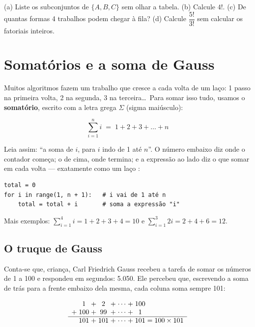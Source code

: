 \begin{exrapido}
(a) Liste os subconjuntos de $\{A, B, C\}$ sem olhar a tabela. (b) Calcule $4!$. (c) De quantas
formas 4 trabalhos podem chegar à fila? (d) Calcule $\dfrac{5!}{3!}$ sem calcular os fatoriais
inteiros.
\end{exrapido}

\section{Somatórios e a soma de Gauss}

Muitos algoritmos fazem um trabalho que cresce a cada volta de um laço: 1 passo na primeira volta,
2 na segunda, 3 na terceira\dots\ Para somar isso tudo, usamos o \textbf{somatório}, escrito com a
letra grega $\Sigma$ (sigma maiúsculo):

\[
\sum_{i=1}^{n} i \;=\; 1 + 2 + 3 + \dots + n
\]

Leia assim: \enquote{a soma de $i$, para $i$ indo de 1 até $n$}. O número embaixo diz onde o
contador começa; o de cima, onde termina; e a expressão ao lado diz o que somar em cada volta —
exatamente como um laço :

\begin{lstlisting}
total = 0
for i in range(1, n + 1):   # i vai de 1 até n
    total = total + i       # soma a expressão "i"
\end{lstlisting}

Mais exemplos: $\sum_{i=1}^{4} i = 1 + 2 + 3 + 4 = 10$ \quad e \quad
$\sum_{i=1}^{3} 2i = 2 + 4 + 6 = 12$.

\subsection{O truque de Gauss}

Conta-se que, criança, Carl Friedrich Gauss recebeu a tarefa de somar os números de 1 a 100 e
respondeu em segundos: 5.050. Ele percebeu que, escrevendo a soma de trás para a frente embaixo
dela mesma, cada coluna soma sempre 101:

\[
\begin{array}{r@{\;}c@{\;}c@{\;}c@{\;}c@{\;}c@{\;}c@{\;}c@{\;}c}
      & 1   & + & 2   & + & \cdots & + & 100 & \\
  +   & 100 & + & 99  & + & \cdots & + & 1   & \\ \hline
      & 101 & + & 101 & + & \cdots & + & 101 & = 100 \times 101
\end{array}
\]

